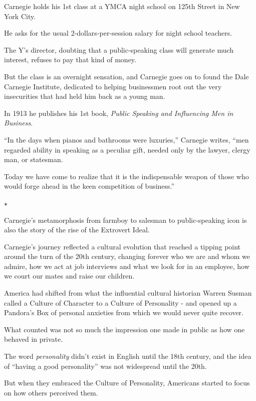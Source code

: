\documentclass[oneside]{article}
\numberwithin{equation}{section}
\begin{document}
Carnegie holds his 1st class at a YMCA night school on 125th Street in New York City.

He asks for the usual 2-dollars-per-session salary for night school teachers.

The Y's director, doubting that a public-speaking class will generate much interest, refuses to pay that kind of money.

%
But the class is an overnight sensation, and Carnegie goes on to found the Dale Carnegie Institute, dedicated to helping businessmen root out the very insecurities that had held him back as a young man.

In 1913 he publishes his 1st book, \textit{Public Speaking and Influencing Men in Business}.

``In the days when pianos and bathrooms were luxuries,'' Carnegie writes, ``men regarded ability in speaking as a peculiar gift, needed only by the lawyer, clergy man, or statesman.

Today we have come to realize that it is the indispensable weapon of those who would forge ahead in the keen competition of business.''
\begin{center}
    $\star$
\end{center}
Carnegie's metamorphosis from farmboy to salesman to public-speaking icon is also the story of the rise of the Extrovert Ideal.

Carnegie's journey reflected a cultural evolution that reached a tipping point around the turn of the 20th century, changing forever who we are and whom we admire, how we act at job interviews and what we look for in an employee, how we court our mates and raise our children.

America had shifted from what the influential cultural historian Warren Susman called a Culture of Character to a Culture of Personality - and opened up a Pandora's Box of personal anxieties from which we would never quite recover.

%

What counted was not so much the impression one made in public as how one behaved in private.

The word \textit{personality} didn't exist in English until the 18th century, and the idea of ``having a good personality'' was not widespread until the 20th.

%
But when they embraced the Culture of Personality, Americans started to focus on how others perceived them.
\end{document}
